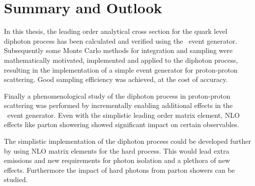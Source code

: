 \chapter{Summary and Outlook}%
\label{chap:summary}

In this thesis, the leading order analytical cross section for the
quark level diphoton process has been calculated and verified using
the \sherpa\ event generator. Subsequently some Monte Carlo methods
for integration and sampling were mathematically motivated,
implemented and applied to the diphoton process, resulting in the
implementation of a simple event generator for proton-proton
scattering. Good sampling efficiency was achieved, at the cost of
accuracy.

Finally a phenomenological study of the diphoton process in
proton-proton scattering was performed by incrementally enabling
additional effects in the \sherpa\ event generator. Even with the
simplistic leading order matrix element, NLO effects like parton
showering showed significant impact on certain observables.

The simplistic implementation of the diphoton process could be
developed further by using NLO matrix elements for the hard
process. This would lead extra emissions and new requirements for
photon isolation and a plethora of new effects. Furthermore the impact
of hard photons from parton showers can be studied.

